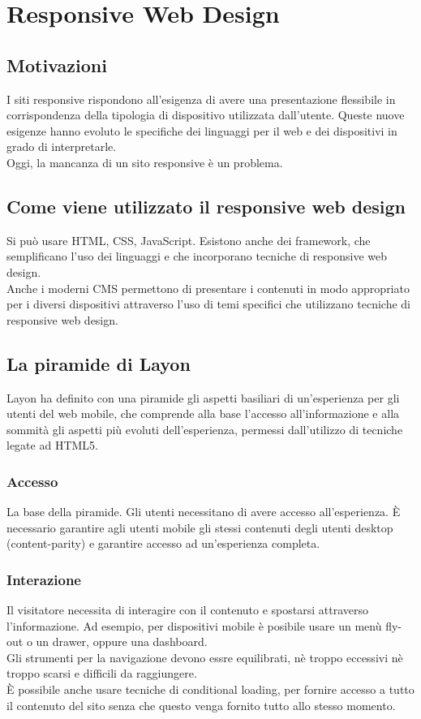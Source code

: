 \documentclass{article}
\begin{document}
\section{Responsive Web Design}
\subsection{Motivazioni}
I siti responsive rispondono all'esigenza di avere una presentazione flessibile in corrispondenza della tipologia di dispositivo utilizzata dall'utente.  Queste nuove esigenze hanno evoluto le specifiche dei linguaggi per il web e dei dispositivi in grado di interpretarle.\\
Oggi, la mancanza di un sito responsive è un problema.
\subsection{Come viene utilizzato il responsive web design}
Si può usare HTML, CSS, JavaScript. Esistono anche dei framework, che semplificano l'uso dei linguaggi e che incorporano tecniche di responsive web design.\\
Anche i moderni CMS permettono di presentare i contenuti in modo appropriato per i diversi dispositivi attraverso l'uso di temi specifici che utilizzano tecniche di responsive web design.
\subsection{La piramide di Layon}
Layon ha definito con una piramide gli aspetti basiliari di un'esperienza per gli utenti del web mobile, che comprende alla base l'accesso all'informazione e alla sommità gli aspetti più evoluti dell'esperienza, permessi dall'utilizzo di tecniche legate ad HTML5.
\subsubsection{Accesso}
La base della piramide. Gli utenti necessitano di avere accesso all'esperienza. È necessario garantire agli utenti mobile gli stessi contenuti degli utenti desktop (content-parity) e garantire accesso ad un'esperienza completa.
\subsubsection{Interazione}
Il visitatore necessita di interagire con il contenuto e spostarsi attraverso l'informazione. 
Ad esempio, per dispositivi mobile è posibile usare un menù fly-out o un drawer, oppure una dashboard.\\Gli strumenti per la navigazione devono essre equilibrati, nè troppo eccessivi nè troppo scarsi e difficili da raggiungere. \\
È possibile anche usare tecniche di conditional loading, per fornire accesso a tutto il contenuto del sito senza che questo venga fornito tutto allo stesso momento.
\end{document}
